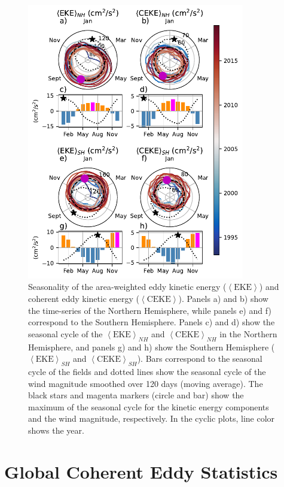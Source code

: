 \documentclass[draft,linenumbers]{agujournal2019}
\newcommand{\EKE}{\textrm{EKE}}
\newcommand{\CEKE}{\textrm{CEKE}}
\begin{document}
	\begin{figure}
	    \centering
	    \includegraphics[width=95mm]{./figures/All_polar_plots.pdf}
	    \caption{Seasonality of the area-weighted eddy kinetic energy ($\left<\EKE\right>$) and coherent eddy kinetic energy ($\left<\CEKE\right>$). 
		Panels a) and b) show the time-series of the Northern Hemisphere, while panels e) and f) correspond to the Southern Hemisphere. Panels c) and d) show the seasonal cycle of the $\left<\EKE\right>_{NH}$ and $\left<\CEKE\right>_{NH}$ in the Northern Hemisphere, and panels g) and h) show the Southern Hemisphere ($\left<\EKE\right>_{SH}$ and $\left<\CEKE\right>_{SH}$).
		Bars correspond to the seasonal cycle of the fields and dotted lines show the seasonal cycle of the wind magnitude smoothed over 120 days (moving average). 
		The black stars and magenta markers (circle and bar) show the maximum of the seasonal cycle for the kinetic energy components and the wind magnitude, respectively. In the cyclic plots, line color shows the year.}
	    \label{fig:eddy_energy_polar}
	\end{figure}
	
	\section{Global Coherent Eddy Statistics}
	\label{sec:CE_stats}
\end{document}

